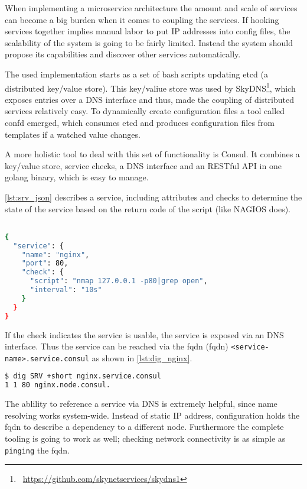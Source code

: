 When implementing a microservice architecture the amount and scale of services can become a big burden when it comes to coupling the services.
If hooking services together implies manual labor to put IP addresses into config files, the scalability of the system is going to be fairly limited.
Instead the system should propose its capabilities and discover other services automatically.

The used implementation starts as a set of bash scripts updating etcd (a distributed key/value store). This key/valiue store was used by SkyDNS\footnote{\Mundus~\url{https://github.com/skynetservices/skydns1}}, which exposes entries
over a DNS interface and thus, made the coupling of distributed services relatively easy. To dynamically create configuration files a tool called confd emerged, which consumes
etcd and produces configuration files from templates if a watched value changes.

A more holistic tool to deal with this set of functionality is Consul. It combines a key/value store, service checks, a DNS interface and an RESTful API
in one golang binary, which is easy to manage.

\autoref{lst:srv_json} describes a service, including attributes and checks to determine the state of the service based on the return code of the script (like NAGIOS does). 

\begin{lstlisting}[language=bash,
    caption={Service definition within consul. If the keyword open is not find within the nmap output the service is marked WARNING},
    label={lst:srv_json}]

{
  "service": {
    "name": "nginx",
    "port": 80,
    "check": {
      "script": "nmap 127.0.0.1 -p80|grep open",
      "interval": "10s"
    }
  }
}
\end{lstlisting}

If the check indicates the service is usable, the service is exposed via an DNS interface.
Thus the service can be reached via the \gls{fqdn} (\glsdesc{fqdn}) \lstinline{<service-name>.service.consul} as shown in \autoref{lst:dig_nginx}.
\begin{lstlisting}[language=bash,
    caption={Exposure of services via DNS.},
    label={lst:dig_nginx}]
$ dig SRV +short nginx.service.consul
1 1 80 nginx.node.consul.
\end{lstlisting}

The ablility to reference a service via DNS is extremely helpful, since name resolving works system-wide. Instead of static IP address,
configuration holds the \gls{fqdn} to describe a dependency to a different node. Furthermore the complete tooling is going to work as well; checking network connectivity is as
simple as \lstinline{pinging} the \gls{fqdn}.

